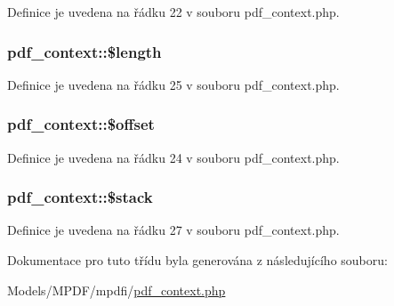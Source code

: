 Definice je uvedena na řádku 22 v souboru pdf\-\_\-context.\-php.

\hypertarget{classpdf__context_a4a7032914ef01157088fc29e2e228bc0}{
\subsubsection[{\$length}]{\setlength{\rightskip}{0pt plus 5cm}pdf\-\_\-context\-::\$length}}\label{classpdf__context_a4a7032914ef01157088fc29e2e228bc0}


Definice je uvedena na řádku 25 v souboru pdf\-\_\-context.\-php.

\hypertarget{classpdf__context_a7828e31df2fad7482aed65e6b013d5f9}{
\subsubsection[{\$offset}]{\setlength{\rightskip}{0pt plus 5cm}pdf\-\_\-context\-::\$offset}}\label{classpdf__context_a7828e31df2fad7482aed65e6b013d5f9}


Definice je uvedena na řádku 24 v souboru pdf\-\_\-context.\-php.

\hypertarget{classpdf__context_aa3022de04734387611e7f834c17fd19b}{
\subsubsection[{\$stack}]{\setlength{\rightskip}{0pt plus 5cm}pdf\-\_\-context\-::\$stack}}\label{classpdf__context_aa3022de04734387611e7f834c17fd19b}


Definice je uvedena na řádku 27 v souboru pdf\-\_\-context.\-php.



Dokumentace pro tuto třídu byla generována z následujícího souboru\-:\begin{DoxyCompactItemize}
\item 
Models/\-M\-P\-D\-F/mpdfi/\hyperlink{pdf__context_8php}{pdf\-\_\-context.\-php}\end{DoxyCompactItemize}
